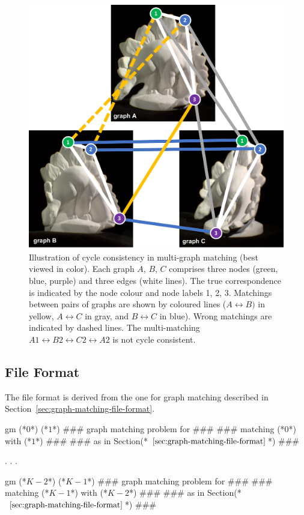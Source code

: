 \begin{figure}[H]
    \centering
    \includegraphics[width=0.7\columnwidth]{images/cycle-consistency.pdf}
    \caption{
        Illustration of cycle consistency in multi-graph matching (best viewed in color).
        Each graph $A$, $B$, $C$ comprises three nodes (green, blue, purple) and three edges (white lines).
        The true correspondence is indicated by the node colour and node labels 1, 2, 3.
        Matchings between pairs of graphs are shown by coloured lines ($A\leftrightarrow B)$ in yellow, $A \leftrightarrow C$ in gray, and $B \leftrightarrow C$ in blue).
        Wrong matchings are indicated by dashed lines.
        The multi-matching $A1 \leftrightarrow B2 \leftrightarrow C2 \leftrightarrow A2$ is not cycle consistent.
    }
    \label{fig:multi-graph-matching}
\end{figure}

\subsection{File Format}
The file format is derived from the one for graph matching described in Section~\ref{sec:graph-matching-file-format}.

\begin{fileformat}
gm (*$0$*) (*$1$*)
### graph matching problem for ###
### matching (*$0$*) with (*$1$*) ###
### as in Section(*$\text{~\ref{sec:graph-matching-file-format}}$*) ###

.
.
.

gm (*$K-2$*) (*$K-1$*)
### graph matching problem for ###
### matching (*$K-1$*) with (*$K-2$*) ###
### as in Section(*$\text{~\ref{sec:graph-matching-file-format}}$*) ###
\end{fileformat}

